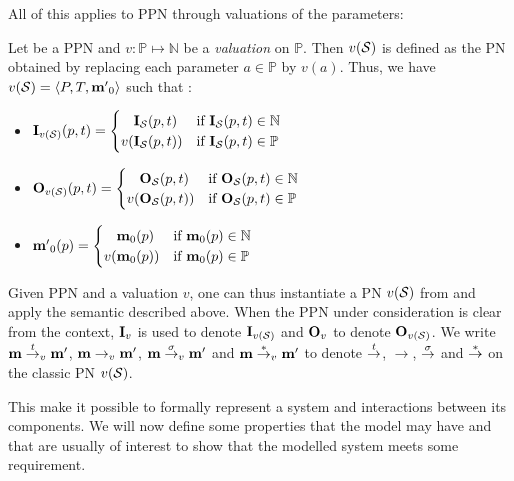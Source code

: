 All of this applies to \ac{PPN} through valuations of the parameters:
\begin{defi}
  Let \SPTPm be a \ac{PPN} and $v : \mathbb{P} \mapsto \mathbb{N}$ be a \emph{valuation} on $\mathbb{P}$.
  Then $v(\mathcal{S})$ is defined as the \ac{PN} obtained by replacing each parameter $a \in \mathbb{P}$ by $v(a)$.
  Thus, we have $v(\mathcal{S}) = \langle P, T, \mathbf{m'}_0\rangle$ such that :
  \begin{itemize}
    \item $\mathbf{I}_{v(\mathcal{S})}(p, t) =
      \begin{cases}
        \phantom{v(}\mathbf{I}_\mathcal{S}(p, t) & \text{if } \mathbf{I}_\mathcal{S}(p, t) \in \mathbb{N} \\
                 v(\mathbf{I}_\mathcal{S}(p, t)) & \text{if } \mathbf{I}_\mathcal{S}(p, t) \in \mathbb{P}
      \end{cases}$
    \item $\mathbf{O}_{v(\mathcal{S})}(p, t) =
      \begin{cases}
        \phantom{v(}\mathbf{O}_\mathcal{S}(p, t) & \text{if } \mathbf{O}_\mathcal{S}(p, t) \in \mathbb{N} \\
                 v(\mathbf{O}_\mathcal{S}(p, t)) & \text{if } \mathbf{O}_\mathcal{S}(p, t) \in \mathbb{P}
      \end{cases}$
    \item $\mathbf{m'}_0(p) =
      \begin{cases}
        \phantom{v(}\mathbf{m}_0(p) & \text{if } \mathbf{m}_0(p) \in \mathbb{N} \\
                 v(\mathbf{m}_0(p)) & \text{if } \mathbf{m}_0(p) \in \mathbb{P}
      \end{cases}$
  \end{itemize}
\end{defi}

Given \ac{PPN} \tupleS and a valuation $v$, one can thus instantiate a \ac{PN} $v(\mathcal{S})$ from \tupleS and apply the semantic described above.  When the \ac{PPN} under consideration is clear from the context, $\mathbf{I}_v$ is used to denote $\mathbf{I}_{v(\mathcal{S})}$ and $\mathbf{O}_v$ to denote $\mathbf{O}_{v(\mathcal{S})}$. We write $\mathbf{m} \stackrel{t}{\to}_v \mathbf{m'}$, $\mathbf{m} \rightarrow_v \mathbf{m'}$, $\mathbf{m} \stackrel{\sigma}{\to}_v \mathbf{m'}$ and $\mathbf{m} \stackrel{*}{\to}_v \mathbf{m'}$ to denote $\stackrel{t}{\to}$, $\rightarrow$, $\stackrel{\sigma}{\to}$ and $\stackrel{*}{\to}$ on the classic \ac{PN} $v(\mathcal{S})$.

This make it possible to formally represent a system and interactions between its components. We will now define some properties that the model may have and that are usually of interest to show that the modelled system meets some requirement.

